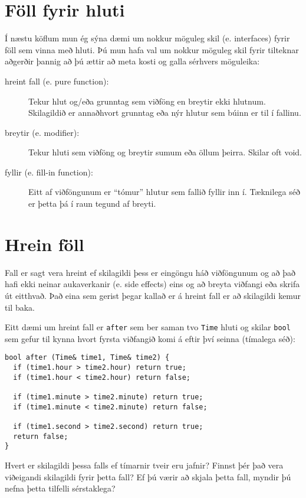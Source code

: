 \section{Föll fyrir hluti}
\label{objectops}

Í næstu köflum mun ég sýna dæmi um nokkur möguleg skil (e. interfaces) fyrir föll sem vinna með hluti.
Þú mun hafa val um nokkur möguleg skil fyrir tilteknar aðgerðir þannig að þú ættir að meta kosti og galla sérhvers möguleika:

\begin{description}

\item[hreint fall (e. pure function):]  Tekur hlut og/eða grunntag sem viðföng en breytir ekki hlutnum.
Skilagildið er annaðhvort grunntag eða nýr hlutur sem búinn er til í fallinu. 

\item[breytir (e. modifier):]  Tekur hluti sem viðföng og breytir sumum eða öllum þeirra.  Skilar oft void. 

\item[fyllir (e. fill-in function):]  Eitt af viðföngunum er ``tómur'' hlutur sem fallið fyllir inn í.
Tæknilega séð er þetta þá í raun tegund af breyti. 

\end{description}

\section{Hrein föll}

Fall er sagt vera hreint ef skilagildi þess er eingöngu háð viðföngunum og að það hafi ekki neinar aukaverkanir (e. side effects)
eins og að breyta viðfangi eða skrifa út eitthvað.
Það eina sem gerist þegar kallað er á hreint fall er að skilagildi kemur til baka.

Eitt dæmi um hreint fall er {\tt after} sem ber saman tvo {\tt Time} hluti og skilar {\tt bool} sem gefur til kynna hvort fyrsta viðfangið komi á eftir því seinna (tímalega séð):

\begin{verbatim}
bool after (Time& time1, Time& time2) {
  if (time1.hour > time2.hour) return true;
  if (time1.hour < time2.hour) return false;

  if (time1.minute > time2.minute) return true;
  if (time1.minute < time2.minute) return false;

  if (time1.second > time2.second) return true;
  return false;
}
\end{verbatim}
%
Hvert er skilagildi þessa falls ef tímarnir tveir eru jafnir?
Finnst þér það vera viðeigandi skilagildi fyrir þetta fall?
Ef þú værir að skjala þetta fall, myndir þú nefna þetta tilfelli sérstaklega?

